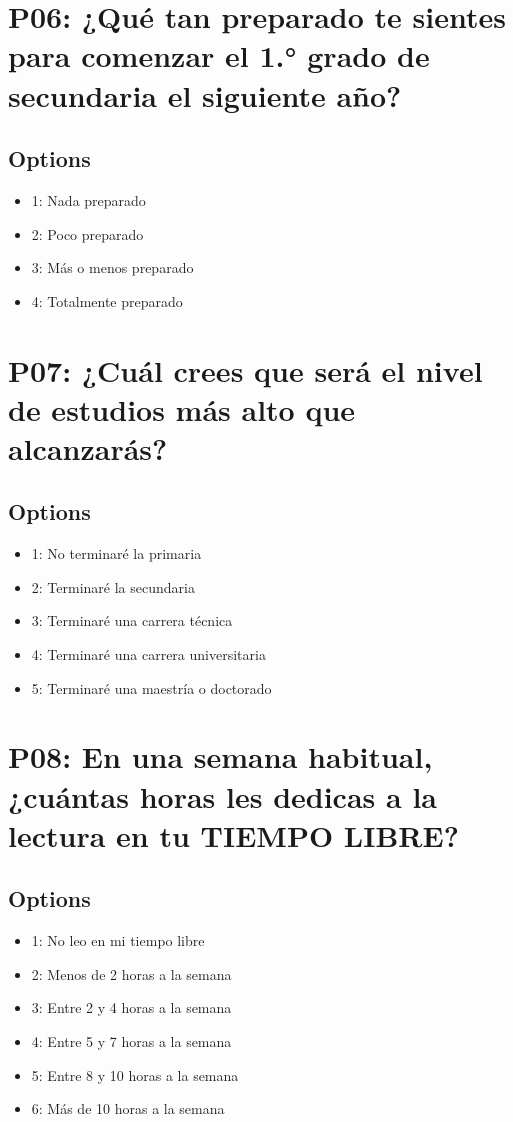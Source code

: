 \documentclass[11pt]{article}
\begin{document}
\section*{P06: ¿Qué tan preparado te sientes para comenzar el 1.° grado de secundaria el siguiente año?}
\subsection*{Options}
\begin{itemize}[leftmargin=*]
  \item 1: Nada preparado
  \item 2: Poco preparado
  \item 3: Más o menos preparado
  \item 4: Totalmente preparado
\end{itemize}
\bigskip
\section*{P07: ¿Cuál crees que será el nivel de estudios más alto que alcanzarás?}
\subsection*{Options}
\begin{itemize}[leftmargin=*]
  \item 1: No terminaré la primaria
  \item 2: Terminaré la secundaria
  \item 3: Terminaré una carrera técnica
  \item 4: Terminaré una carrera universitaria
  \item 5: Terminaré una maestría o doctorado
\end{itemize}
\bigskip
\section*{P08: En una semana habitual, ¿cuántas horas les dedicas a la lectura en tu TIEMPO LIBRE?}
\subsection*{Options}
\begin{itemize}[leftmargin=*]
  \item 1: No leo en mi tiempo libre
  \item 2: Menos de 2 horas a la semana
  \item 3: Entre 2 y 4 horas a la semana
  \item 4: Entre 5 y 7 horas a la semana
  \item 5: Entre 8 y 10 horas a la semana
  \item 6: Más de 10 horas a la semana
\end{itemize}
\bigskip
\end{document}
